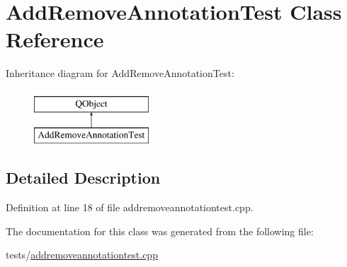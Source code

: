 \hypertarget{classAddRemoveAnnotationTest}{\section{Add\+Remove\+Annotation\+Test Class Reference}
\label{classAddRemoveAnnotationTest}
}
Inheritance diagram for Add\+Remove\+Annotation\+Test\+:\begin{figure}[H]
\begin{center}
\leavevmode
\includegraphics[height=2.000000cm]{classAddRemoveAnnotationTest}
\end{center}
\end{figure}


\subsection{Detailed Description}


Definition at line 18 of file addremoveannotationtest.\+cpp.



The documentation for this class was generated from the following file\+:\begin{DoxyCompactItemize}
\item 
tests/\hyperlink{addremoveannotationtest_8cpp}{addremoveannotationtest.\+cpp}\end{DoxyCompactItemize}
